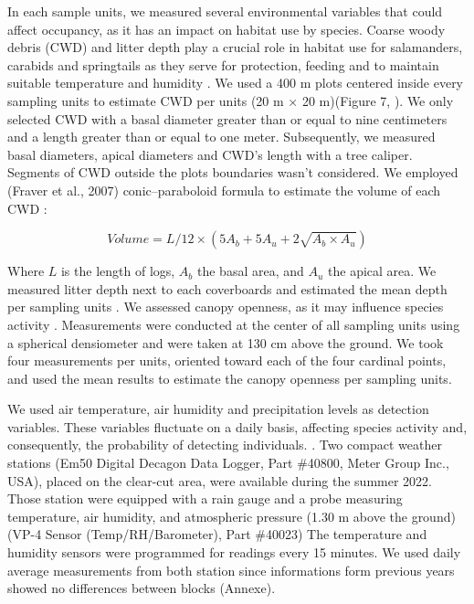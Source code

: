 In each sample units, we measured several environmental variables that could affect occupancy, as it has an impact on habitat use by species.
Coarse woody debris (CWD) and litter depth play a crucial role in habitat use for salamanders, carabids and springtails as
they serve for protection, feeding and to maintain suitable temperature and humidity \citep{birdChangesSoilLitter2004,groverInfluenceCoverMoisture1998a,harmonEcologyCoarseWoody1986,koivula.LeafLitterSmallscale1999,mckennyEffectsStructuralComplexity2006,patrickEffectsExperimentalForestry2006a}. 
We used a 400 m plots centered inside every sampling units to estimate CWD per units (20 m $\times$  20 m)(Figure 7, \citealp{methotGuideInventaireEchantillonnage2014}). 
We only selected CWD with a basal diameter greater than or equal to nine centimeters and a length greater than or equal to one meter.
Subsequently, we measured basal diameters, apical diameters and CWD's length with a tree caliper. 
Segments of CWD outside the plots boundaries wasn't considered.
We employed (Fraver et al., 2007) conic–paraboloid formula to estimate the volume of each CWD :


\[Volume = L/12 \times (5A_b + 5A_u + 2\sqrt{A_b \times A_u})\]

Where $L$ is the length of logs, $A_b$ the basal area, and $A_u$ the apical area.
We measured litter depth next to each coverboards and estimated the mean depth per sampling units \citep{mazerolleWoodlandSalamanderPopulation2021a}. 
We assessed canopy openness, as it may influence species activity \citep{henneronForestPlantCommunity2017,koivulaBorealCarabidbeetleColeoptera2002a,kotzeFortyYearsCarabid2011a,messereForestFloorDistribution1998,tilghmanMetaanalysisEffectsCanopy2012}.
Measurements were conducted at the center of all sampling units using a spherical densiometer \citep{lemmonSphericalDensiometerEstimating1956} and were taken at 130 cm above the ground. 
We took four measurements per units, oriented toward each of the four cardinal points, and used the mean results to estimate the canopy openness per sampling units.

We used air temperature, air humidity and precipitation levels as detection variables.
These variables fluctuate on a daily basis, affecting species activity and, consequently, the probability of detecting individuals. 
\citep{butterfieldCarabidLifeCycle1996,kotzeFortyYearsCarabid2011a,loveiEcologyBehaviorGround1996,odonnellPredictingVariationMicrohabitat2014a,spotilaRoleTemperatureWater1972}.
Two compact weather stations (Em50 Digital Decagon Data Logger, Part \#40800, Meter Group Inc., USA), placed on the clear-cut area, were available during the summer 2022.
Those station were equipped with a rain gauge and a probe measuring temperature, air humidity, and atmospheric pressure (1.30 m above the ground)(VP-4 Sensor (Temp/RH/Barometer), Part \#40023)
The temperature and humidity sensors were programmed for readings every 15 minutes. 
We used daily average measurements from both station since informations form previous years showed no differences between blocks (Annexe).




